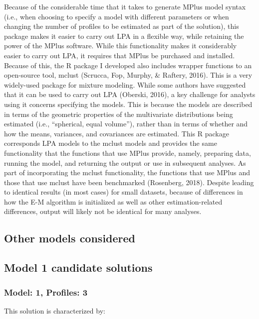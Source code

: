 \documentclass[]{book}
\theoremstyle{definition}
\theoremstyle{definition}
\theoremstyle{definition}
\theoremstyle{remark}
\begin{document}
Because of the considerable time that it takes to generate MPlus model
syntax (i.e., when choosing to specify a model with different parameters
or when changing the number of profiles to be estimated as part of the
solution), this package makes it easier to carry out LPA in a flexible
way, while retaining the power of the MPlus software. While this
functionality makes it considerably easier to carry out LPA, it requires
that MPlus be purchased and installed. Because of this, the R package I
developed also includes wrapper functions to an open-source tool, mclust
(Scrucca, Fop, Murphy, \& Raftery, 2016). This is a very widely-used
package for mixture modeling. While some authors have suggested that it
can be used to carry out LPA (Oberski, 2016), a key challenge for
analysts using it concerns specifying the models. This is because the
models are described in terms of the geometric properties of the
multivariate distributions being estimated (i.e., ``spherical, equal
volume''), rather than in terms of whether and how the means, variances,
and covariances are estimated. This R package corresponds LPA models to
the mclust models and provides the same functionality that the functions
that use MPlus provide, namely, preparing data, running the model, and
returning the output or use in subsequent analyses. As part of
incorporating the mclust functionality, the functions that use MPlus and
those that use mclust have been benchmarked (Rosenberg, 2018). Despite
leading to identical results (in most cases) for small datasets, because
of differences in how the E-M algorithm is initialized as well as other
estimation-related differences, output will likely not be identical for
many analyses.

\subsection{Other models considered}\label{other-models-considered}

\subsection{Model 1 candidate
solutions}\label{model-1-candidate-solutions}

\subsubsection{Model: 1, Profiles: 3}\label{model-1-profiles-3}

This solution is characterized by:
\end{document}
